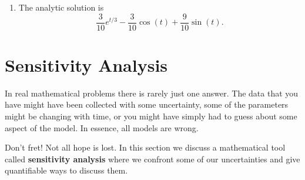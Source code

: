 \begin{example}
\begin{enumerate}
\[\begin{array}{ccc|c}
                    1 & 1 & 0 & 0 \\ 
                    0 & 1 & 1/3 & 0 \\ 
                    0 & 1/3 & -1 & -1 \end{array} \right) \to 
                \left( \begin{array}{ccc|c}  
                    1 & 0 & -1/3 & 0 \\ 
                    0 & 1 & 1/3 & 0 \\ 
                    0 & 0 & -10/9 & -1 \end{array} \right) \to 
                \left( \begin{array}{ccc|c}  
                    1 & 0 & 0 & 3/10 \\ 
                    0 & 1 & 0 & -3/10 \\ 
                    0 & 0 & 1 & 9/10 \end{array} \right).
            \]
        \item The analytic solution is
            \[ \frac{3}{10} e^{t/3} - \frac{3}{10} \cos(t) + \frac{9}{10} \sin(t). \]
    \end{enumerate}
\end{example}


\newpage
\section{Sensitivity Analysis}
In real mathematical problems there is rarely just one answer.  The data that you have
might have been collected with some uncertainty, some of the parameters might be changing
with time, or you might have simply had to guess about some aspect of the model.  In
essence, all models are wrong.

Don't fret!  Not all hope is lost.  In this section we discuss a mathematical tool called {\bf
sensitivity analysis} where we confront some of our uncertainties and give quantifiable
ways to discuss them.

